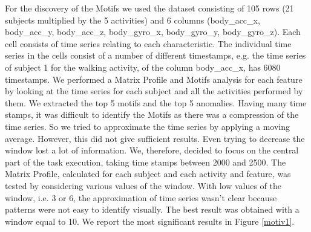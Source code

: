\documentclass[10pt, a4paper, twocolumn]{article}
\begin{document}
For the discovery of the Motifs we used the dataset consisting of 105 rows (21 subjects multiplied by the 5 activities) and 6 columns (body\_acc\_x, body\_acc\_y, body\_acc\_z, body\_gyro\_x, body\_gyro\_y, body\_gyro\_z). Each cell consists of time series relating to each characteristic. The individual time series in the cells consist of a number of different timestamps, e.g. the time series of subject 1 for the walking activity, of the column body\_acc\_x, has 6080 timestamps. 
We performed a Matrix Profile and Motifs analysis for each feature by looking at the time series for each subject and all the activities performed by them. We extracted the top 5 motifs and the top 5 anomalies. 
Having many time stamps, it was difficult to identify the Motifs as there was a compression of the time series. So we tried to approximate the time series by applying a moving average. However, this did not give sufficient results. Even trying to decrease the window lost a lot of information. We, therefore, decided to focus on the central part of the task execution, taking time stamps between 2000 and 2500. 
The Matrix Profile, calculated for each subject and each activity and feature, was tested by considering various values of the window. With low values of the window, i.e. 3 or 6, the approximation of time series wasn't clear because patterns were not easy to identify visually. The best result was obtained with a window equal to 10. We report the most significant results in Figure \ref{motiv1}.
\end{document}

